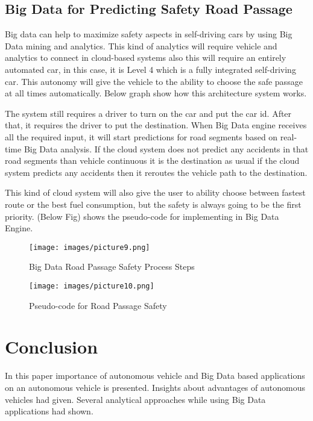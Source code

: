 \documentclass[sigconf]{acmart}
\begin{document}
\subsection{Big Data for Predicting Safety Road Passage}
Big data can help to maximize safety aspects in self-driving cars by using Big Data mining and analytics. This kind of analytics will require vehicle and analytics to connect in cloud-based systems also this will require an entirely automated car, in this case, it is Level 4 which is a fully integrated self-driving car. This autonomy will give the vehicle to the ability to choose the safe passage at all times automatically. Below graph show how this architecture system works. \cite{hamzah}
\par The system still requires a driver to turn on the car and put the car id. After that, it requires the driver to put the destination. When Big Data engine receives all the required input, it will start predictions for road segments based on real-time Big Data analysis. If the cloud system does not predict any accidents in that road segments than vehicle continuous it is the destination as usual if the cloud system predicts any accidents then it reroutes the vehicle path to the destination.\cite{hamzah}
\par This kind of cloud system will also give the user to ability choose between fastest route or the best fuel consumption, but the safety is always going to be the first priority. (Below Fig) shows the pseudo-code for implementing in Big Data Engine.
\begin{figure}[!ht]
  \centering
      \texttt{[image: images/picture9.png]}
  \caption{Big Data Road Passage Safety Process Steps}\label{F:architecture}
\end{figure}

\begin{figure}[!ht]
  \centering
      \texttt{[image: images/picture10.png]}
  \caption{Pseudo-code for Road Passage Safety}\label{F:pseudo-code}
\end{figure}

\section{Conclusion}
    In this paper importance of autonomous vehicle and Big Data based applications on an autonomous vehicle is presented. Insights about advantages of autonomous vehicles had given. Several analytical approaches while using Big Data applications had shown.



 
\end{document}
